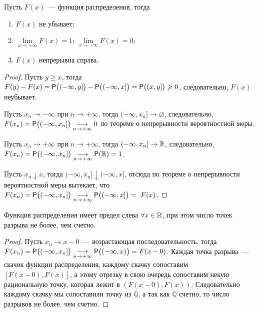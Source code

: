 \begin{lemma}
	Пусть $F(x)$~--- функция распределения, тогда
	\begin{enumerate}
		\item $F(x)$ не убывает;
		\item $\lim\limits_{x \rightarrow +\infty} F(x) = 1$; $\lim\limits_{x \rightarrow -\infty} F(x) = 0$;
		\item $F(x)$ непрерывна справа.
	\end{enumerate}
	\begin{proof}
		Пусть $y \geqslant x$, тогда $F(y) - F(x) = \P \big( (-\infty, y] \big) - \P \big( (-\infty, x] \big) = \P \big( (x, y] \big) \geqslant 0$, следовательно, $F(x)$ неубывает.
		
		Пусть $x_n \rightarrow -\infty$ при $n \rightarrow +\infty$, тогда $(-\infty, x_n] \rightarrow \varnothing$, следовательно, $F(x_n) = \P \big( (-\infty, x_n] \big) \underset{n \rightarrow +\infty}{\longrightarrow} 0$ по теореме о непрерывности вероятностной меры. 
		
		Пусть $x_n \rightarrow +\infty$ при $n \rightarrow +\infty$, тогда $(-\infty, x_n] \rightarrow \R$, следовательно, $F(x_n) = \P \big( (-\infty, x_n] \big) \underset{n \rightarrow +\infty}{\longrightarrow} \P(\R) = 1$.
				
		Пусть $x_n \downarrow x$, тогда $(-\infty, x_n] \downarrow (-\infty, x]$, отсюда по теореме о непрерывности вероятностной меры вытекает, что $F(x_n) = \P \big( (-\infty, x_n] \big) \underset{n \rightarrow +\infty}{\longrightarrow} \P \big( (-\infty, x] \big) =~F(x)$.
	\end{proof}
\end{lemma}
\begin{property}
	Функция распределения имеет предел слева $\forall x \in \R$, при этом число точек разрыва не более, чем счетно.
	\begin{proof}
		Пусть $x_n \rightarrow x - 0$~--- возрастающая последовательность, тогда $F(x_n) = \P \big( (-\infty, x_n] \big) \underset{n \rightarrow +\infty}{\longrightarrow} \P \big( (-\infty, x) \big) = F(x - 0)$. Каждая точка разрыва~--- скачок функции распределения, каждому скачку сопоставим $[F(x-0), F(x)]$, а этому отрезку в свою очередь сопоставим некую рациональную точку, которая лежит в $(F(x-0), F(x))$. Следовательно каждому скачку мы сопоставили точку из $\mathbb{Q}$, а так как $\mathbb{Q}$ счетно, то число разрывов не более, чем счетно.
	\end{proof}
\end{property}
